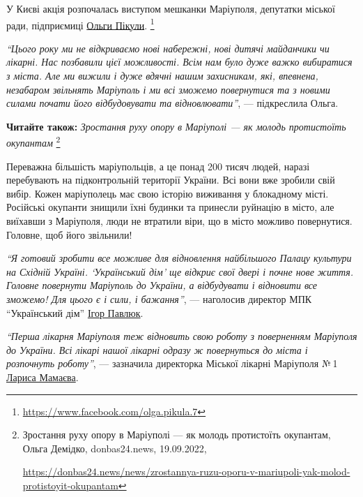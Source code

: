 
У Києві акція розпочалась виступом мешканки Маріуполя, депутатки міської ради,
підприємиці \href{https://www.facebook.com/olga.pikula.7}{Ольги Пікули}.%
\footnote{\url{https://www.facebook.com/olga.pikula.7}}

\begin{leftbar}
\emph{\enquote{Цього року ми не відкриваємо нові набережні, нові дитячі майданчики чи
лікарні. Нас позбавили цієї можливості. Всім нам було дуже важко
вибиратися з міста. Але ми вижили і дуже вдячні нашим захисникам, які,
впевнена, незабаром звільнять Маріуполь і ми всі зможемо повернутися та
з новими силами почати його відбудовувати та відновлювати}}, —
підкреслила Ольга.
\end{leftbar}


\textbf{Читайте також:} \emph{Зростання руху опору в Маріуполі — як молодь протистоїть окупантам}%
\footnote{Зростання руху опору в Маріуполі — як молодь протистоїть окупантам, Ольга Демідко, donbas24.news, 19.09.2022, \par%
\url{https://donbas24.news/news/zrostannya-ruzu-oporu-v-mariupoli-yak-molod-protistoyit-okupantam}%
}

Переважна більшість маріупольців, а це понад 200 тисяч людей, наразі
перебувають на підконтрольній території України. Всі вони вже зробили свій
вибір. Кожен маріуполець має свою історію виживання у блокадному місті.
Російські окупанти знищили їхні будинки та принесли руйнацію в місто, але
виїхавши з Маріуполя, люди не втратили віри, що в місто можливо повернутися.
Головне, щоб його звільнили! 

\begin{leftbar}
\emph{\enquote{Я готовий зробити все можливе для відновлення найбільшого Палацу культури
на Східній Україні. \enquote{Український дім} ще відкриє свої двері і почне
нове життя. Головне повернути Маріуполь до України, а відбудувати і
відновити все зможемо! Для цього є і сили, і бажання}}, — наголосив
директор МПК \enquote{Український дім} \href{https://www.facebook.com/pavlukigor}{Ігор Павлюк}.%
\end{leftbar}

\begin{leftbar}
\emph{\enquote{Перша лікарня Маріуполя теж відновить свою роботу з поверненням Маріуполя
до України. Всі лікарі нашої лікарні одразу ж повернуться до міста і
розпочнуть роботу}}, — зазначила директорка Міської лікарні Маріуполя
№ 1 \href{https://www.facebook.com/profile.php?id=100014146715674}{Лариса Мамаєва}.%
\end{leftbar}

